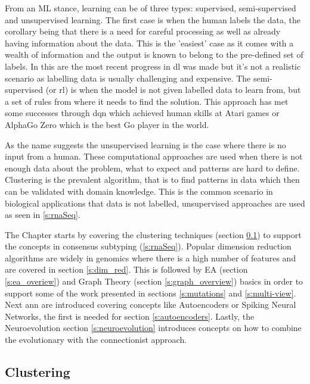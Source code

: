 From an ML stance, learning can be of three types: supervised, semi-supervised and unsupervised learning. The first case is when the human labels the data, the corollary being that there is a need for careful processing as well as already having information about the data. This is the 'easiest' case as it comes with a wealth of information and the output is known to belong to the pre-defined set of labels. In this are the most recent progress in \acrfull{dl} was made but it's not a realistic scenario as labelling data is usually challenging and expensive. The semi-supervised (or \acrfull{rl}) is when the model is not given labelled data to learn from, but a set of rules from where it needs to find the solution. This approach has met some successes through \acrfull{dqn} which achieved human skills at Atari games\cite{Mnih2015-cw} or AlphaGo Zero\cite{Silver2017-sw} which is the best Go player in the world. 

As the name suggests the unsupervised learning is the case where there is no input from a human. These computational approaches are used when there is not enough data about the problem, what to expect and patterns are hard to define. Clustering is the prevalent algorithm, that is to find patterns in data which then can be validated with domain knowledge. This is the common scenario in biological applications that data is not labelled, unsupervised approaches are used as seen in \ref{s:rnaSeq}.

The Chapter starts by covering the clustering techniques (section \ref{s:clustering}) to support the concepts in consensus subtyping (\ref{s:rnaSeq}). Popular dimension reduction algorithms are widely in genomics where there is a high number of features and are covered in section \ref{s:dim_red}. This is followed by EA (section \ref{s:ea_overiew}) and Graph Theory (section \ref{s:graph_overview}) basics in order to support some of the work presented in sections \ref{s:mutations} and \ref{s:multi-view}. Next \acrlong{ann} are introduced covering concepts like Autoencoders or Spiking Neural Networks, the first is needed for section \ref{s:autoencoders}. Lastly, the Neuroevolution section \ref{s:neuroevolution} introduces concepts on how to combine the evolutionary with the connectionist approach. 

\subsection{Clustering} \label{s:clustering}

